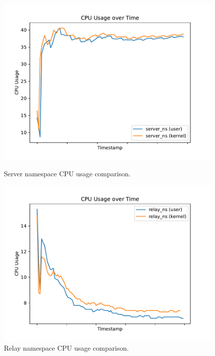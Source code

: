 \begin{figure}[!htb]
    \begin{minipage}{0.48\textwidth}
        \centering
        \includegraphics[width=1\linewidth]{figures/04_testing_and_results/cpu_usage_server_ns.pdf}
        \caption[Server CPU usage comparison]{Server namespace CPU usage comparison.}\label{fig:cpu-utilization-server}
    \end{minipage}\hfill
    \begin{minipage}{0.48\textwidth}
        \centering
        \includegraphics[width=1\linewidth]{figures/04_testing_and_results/cpu_usage_relay_ns.pdf}
        \caption[Relay CPU usage comparison]{Relay namespace CPU usage comparison.}\label{fig:cpu-utilization-relay}

\end{minipage}
\end{figure}
